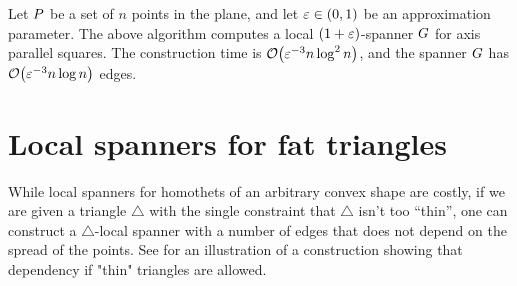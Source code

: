 \documentclass[12pt]{article}%
\begin{document}
\begin{theorem}
    Let $P$ be a set of $n$ points in the plane, and let
    $\varepsilon \in (0,1)$ be an approximation parameter. The above
    algorithm computes a local $(1+\varepsilon)$-spanner $G$ for axis
    parallel squares.  The construction time is
    $\Of\pth{\eps^{-3} n \log^2 n}$, and the spanner $G$ has
    $\Of\pth{\eps^{-3} n \log n}$ edges.
\end{theorem}




\section{Local spanners for fat triangles}



While local spanners for homothets of an arbitrary convex shape are
costly, if we are given a triangle $\triangle$ with the single
constraint that $\triangle$ isn't too ``thin'', one can construct a
$\triangle$-local spanner with a number of edges that does not depend
on the spread of the points. See  for an
illustration of a construction showing that dependency if "thin"
triangles are allowed.
\end{document}
